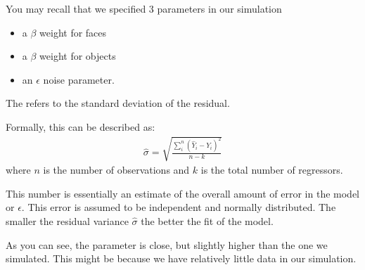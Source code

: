 \documentclass[letterpaper,10pt,english]{sphinxmanual}
\begin{document}
You may recall that we specified 3 parameters in our simulation
\begin{itemize}
\item {} 
a \(\beta\) weight for faces

\item {} 
a \(\beta\) weight for objects

\item {} 
an \(\epsilon\) noise parameter.

\end{itemize}

The  refers to the standard deviation of the residual.

Formally, this can be described as:
\begin{equation*}
\begin{split}\hat \sigma = \sqrt{\frac{\displaystyle \sum_i^n(\hat Y_i - Y_i)^2}{n-k}}\end{split}
\end{equation*}
where \(n\) is the number of observations and \(k\) is the total number of regressors.

This number is essentially an estimate of the overall amount of error in the model or \(\epsilon\). This error is assumed to be independent and normally distributed. The smaller the residual variance \(\hat\sigma\) the better the fit of the model.

As you can see, the parameter is close, but slightly higher than the one we simulated.  This might be because we have relatively little data in our simulation.

\begin{sphinxVerbatim}[commandchars=\\\{\}]
  


 
 
 
\end{sphinxVerbatim}
\end{document}
